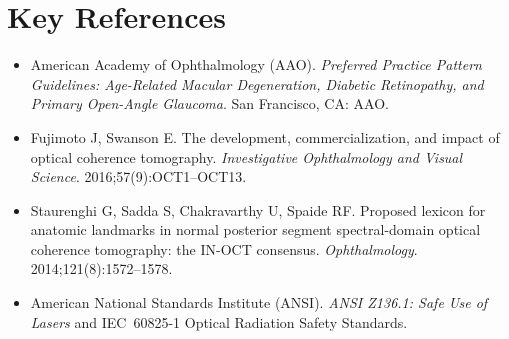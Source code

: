 \section{Key References}
\begin{itemize}
\item American Academy of Ophthalmology (AAO). \textit{Preferred Practice Pattern Guidelines: Age-Related Macular Degeneration, Diabetic Retinopathy, and Primary Open-Angle Glaucoma}. San Francisco, CA: AAO.
\item Fujimoto J, Swanson E. The development, commercialization, and impact of optical coherence tomography. \textit{Investigative Ophthalmology and Visual Science}. 2016;57(9):OCT1--OCT13.
\item Staurenghi G, Sadda S, Chakravarthy U, Spaide RF. Proposed lexicon for anatomic landmarks in normal posterior segment spectral-domain optical coherence tomography: the IN-OCT consensus. \textit{Ophthalmology}. 2014;121(8):1572--1578.
\item American National Standards Institute (ANSI). \textit{ANSI Z136.1: Safe Use of Lasers} and IEC~60825-1 Optical Radiation Safety Standards.
\end{itemize}
